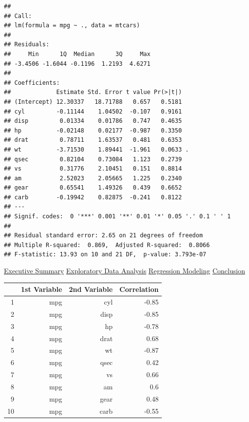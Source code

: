 \documentclass[10pt,]{article}
\begin{document}

\begin{verbatim}
## 
## Call:
## lm(formula = mpg ~ ., data = mtcars)
## 
## Residuals:
##     Min      1Q  Median      3Q     Max 
## -3.4506 -1.6044 -0.1196  1.2193  4.6271 
## 
## Coefficients:
##             Estimate Std. Error t value Pr(>|t|)  
## (Intercept) 12.30337   18.71788   0.657   0.5181  
## cyl         -0.11144    1.04502  -0.107   0.9161  
## disp         0.01334    0.01786   0.747   0.4635  
## hp          -0.02148    0.02177  -0.987   0.3350  
## drat         0.78711    1.63537   0.481   0.6353  
## wt          -3.71530    1.89441  -1.961   0.0633 .
## qsec         0.82104    0.73084   1.123   0.2739  
## vs           0.31776    2.10451   0.151   0.8814  
## am           2.52023    2.05665   1.225   0.2340  
## gear         0.65541    1.49326   0.439   0.6652  
## carb        -0.19942    0.82875  -0.241   0.8122  
## ---
## Signif. codes:  0 '***' 0.001 '**' 0.01 '*' 0.05 '.' 0.1 ' ' 1
## 
## Residual standard error: 2.65 on 21 degrees of freedom
## Multiple R-squared:  0.869,  Adjusted R-squared:  0.8066 
## F-statistic: 13.93 on 10 and 21 DF,  p-value: 3.793e-07
\end{verbatim}

\hyperref[eo]{Executive Summary} \textbar{} \hyperref[eda]{Exploratory
Data Analysis} \textbar{} \hyperref[rm]{Regression Modeling} \textbar{}
\hyperref[conclusion]{Conclusion}


\begin{tabular}{rrrr}
  \hline
 & 1st Variable & 2nd Variable & Correlation \\ 
  \hline
1 & mpg & cyl & -0.85 \\ 
  2 & mpg & disp & -0.85 \\ 
  3 & mpg & hp & -0.78 \\ 
  4 & mpg & drat & 0.68 \\ 
  5 & mpg & wt & -0.87 \\ 
  6 & mpg & qsec & 0.42 \\ 
  7 & mpg & vs & 0.66 \\ 
  8 & mpg & am & 0.6 \\ 
  9 & mpg & gear & 0.48 \\ 
  10 & mpg & carb & -0.55 \\ 
   \hline
\end{tabular}
\end{document}
